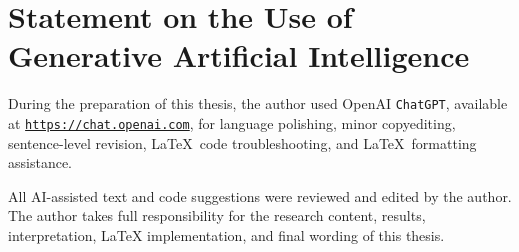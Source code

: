 \chapter*{Statement on the Use of Generative Artificial Intelligence}

During the preparation of this thesis, the author used OpenAI \texttt{ChatGPT}, available at \href{https://chat.openai.com/}{\texttt{https://chat.openai.com}}, for language polishing, minor copyediting, sentence-level revision, \LaTeX~code troubleshooting, and \LaTeX~formatting assistance.

All AI-assisted text and code suggestions were reviewed and edited by the author.
The author takes full responsibility for the research content, results, interpretation, LaTeX implementation, and final wording of this thesis.

